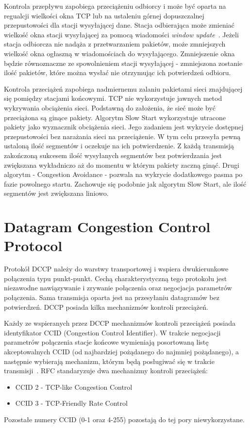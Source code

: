 Kontrola przepływu zapobiega przeciążeniu odbiorcy i może być oparta na regualcji wielkości okna TCP lub na ustaleniu górnej dopuszczalnej przepustowości dla stacji wysyłającej dane.  Stacja odbierająca może zmieniać wielkość okna stacji wysyłającej za pomocą wiadomości \textit{window update}~\cite{Stevens}. Jeżeli stacja odbiorcza nie nadąża z przetwarzaniem pakietów, może zmniejszych wielkość okna ogłaszną w wiadomościach do wysyłającego. Zmniejszenie okna będzie równoznaczne ze spowolnieniem stacji wysyłającej - zmniejszona zostanie ilość pakietów, które można wysłać nie otrzymując ich potwierdzeń odbioru.

Kontrola przeciążeń zapobiega nadmiernemu zalaniu pakietami sieci znajdującej się pomiędzy stacjami końcowymi. TCP nie wykorzystuje  jawnych metod wykrywania obciążenia sieci. Podstawną do założenia, że sieć może być przeciążona są ginące pakiety. Algorytm Slow Start wykorzystuje utracone pakiety jako wyznacznik obciążenia sieci. 
Jego zadaniem jest wykrycie dostępnej przepustowości bez narażania sieci na przeciążenie. W tym celu przesyła pewną ustaloną ilość segmentów i oczekuje na ich potwierdzenie. Z każdą transmisją zakończoną sukcesem ilość wysyłanych segmentów bez potwierdzania jest zwiększana wykładniczo aż do momentu w którym pakiety zaczną ginąć. Drugi algorytm - Congestion Avoidance - pozwala na wykrycie dodatkowego pasma po fazie powolnego startu. Zachowuje się podobnie jak algorytm Slow Start, ale ilość segmentów jest zwiększana liniowo.~\cite{RFC793}

\section{Datagram Congestion Control Protocol}

Protokół DCCP należy do warstwy transportowej i wspiera dwukierunkowe połączenia typu punkt-punkt. Cechą charakterystyczną tego protokołu jest niezawodne nawiązywanie i zrywanie połączenia oraz negocjacja parametrów połączenia. Sama transmisja oparta jest na przesyłaniu datagramów bez potwierdzeń. DCCP posiada kilka mechanizmów kontroli przeciążeń.

Każdy ze wspieranych przez DCCP mechanizmów kontroli przeciążeń posiada identyfikator CCID (Congestion Control Identifier). W trakcie negocjacji parametrów połączenia stacje końcowe wymieniają posortowaną listę akceptowalnych CCID (od najbardziej pożądanego do najmniej pożądanego), a następnie wybierają mechanizm, którym będą posługiwać się w trakcie transmisji~\cite{RFC5762}. RFC standaryzuje dwa mechanizmy kontroli przeciążeń:
\begin{itemize}
  \item CCID 2 - TCP-like Congestion Control
  \item CCID 3 - TCP-Friendly Rate Control
\end{itemize}
Pozostałe numery CCID (0-1 oraz 4-255) pozostają do tej pory niewykorzystane.


